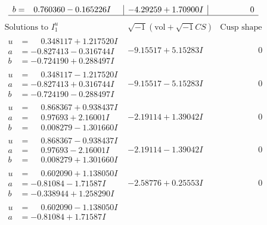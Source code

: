 \documentclass[1p]{elsarticle_modified}
\theoremstyle{definition}
\newcommand{\I}{\sqrt{-1}}
\begin{document}
$$\begin{array}{c|c|c}
\begin{aligned}
b &= \phantom{-}0.760360 - 0.165226 I\end{aligned}
 & -4.29259 + 1.70900 I & \phantom{-0.000000 } 0\\
 \hline 
 \end{array}$$\newpage$$\begin{array}{c|c|c}  
\text{Solutions to }I^u_{1}& \I (\text{vol} + \sqrt{-1}CS) & \text{Cusp shape}\\
 \hline 
\begin{aligned}
u &= \phantom{-}0.348117 + 1.217520 I \\
a &= -0.827413 - 0.316744 I \\
b &= -0.724190 + 0.288497 I\end{aligned}
 & -9.15517 + 5.15283 I & \phantom{-0.000000 } 0 \\ \hline\begin{aligned}
u &= \phantom{-}0.348117 - 1.217520 I \\
a &= -0.827413 + 0.316744 I \\
b &= -0.724190 - 0.288497 I\end{aligned}
 & -9.15517 - 5.15283 I & \phantom{-0.000000 } 0 \\ \hline\begin{aligned}
u &= \phantom{-}0.868367 + 0.938437 I \\
a &= \phantom{-}0.97693 + 2.16001 I \\
b &= \phantom{-}0.008279 - 1.301660 I\end{aligned}
 & -2.19114 + 1.39042 I & \phantom{-0.000000 } 0 \\ \hline\begin{aligned}
u &= \phantom{-}0.868367 - 0.938437 I \\
a &= \phantom{-}0.97693 - 2.16001 I \\
b &= \phantom{-}0.008279 + 1.301660 I\end{aligned}
 & -2.19114 - 1.39042 I & \phantom{-0.000000 } 0 \\ \hline\begin{aligned}
u &= \phantom{-}0.602090 + 1.138050 I \\
a &= -0.81084 - 1.71587 I \\
b &= -0.338944 + 1.258290 I\end{aligned}
 & -2.58776 + 0.25553 I & \phantom{-0.000000 } 0 \\ \hline\begin{aligned}
u &= \phantom{-}0.602090 - 1.138050 I \\
a &= -0.81084 + 1.71587 I \\

\end{aligned}
\end{array}$$
\end{document}
